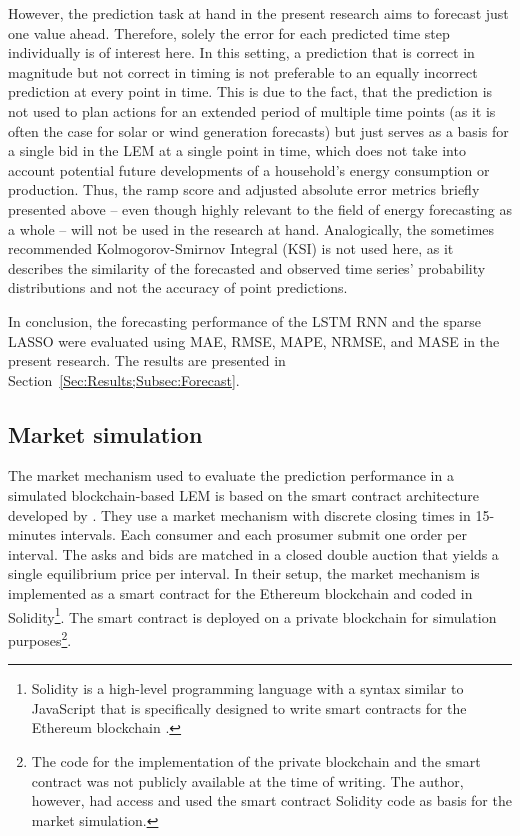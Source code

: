 However, the prediction task at hand in the present research aims to forecast just one value ahead. Therefore, solely the error for each predicted time step individually is of interest here. In this setting, a prediction that is correct in magnitude but not correct in timing is not preferable to an equally incorrect prediction at every point in time. This is due to the fact, that the prediction is not used to plan actions for an extended period of multiple time points (as it is often the case for solar or wind generation forecasts) but just serves as a basis for a single bid in the LEM at a single point in time, which does not take into account potential future developments of a household's energy consumption or production. Thus, the ramp score and adjusted absolute error metrics briefly presented above -- even though highly relevant to the field of energy forecasting as a whole -- will not be used in the research at hand. Analogically, the sometimes recommended Kolmogorov-Smirnov Integral (KSI) \citep{Espinar:2009} is not used here, as it describes the similarity of the forecasted and observed time series' probability distributions and not the accuracy of point predictions.

In conclusion, the forecasting performance of the LSTM RNN and the sparse LASSO were evaluated using MAE, RMSE, MAPE, NRMSE, and MASE in the present research. The results are presented in Section~\ref{Sec:Results;Subsec:Forecast}.




\subsection{Market simulation} \label{Sec:Method;Subsec:Market}

The market mechanism used to evaluate the prediction performance in a simulated blockchain-based LEM is based on the smart contract architecture developed by \cites{Mengelkamp:2018a}. They use a market mechanism with discrete closing times in 15-minutes intervals. Each consumer and each prosumer submit one order per interval. The asks and bids are matched in a closed double auction that yields a single equilibrium price per interval. In their setup, the market mechanism is implemented as a smart contract for the Ethereum blockchain and coded in Solidity\footnote{Solidity is a high-level programming language with a syntax similar to JavaScript that is specifically designed to write smart contracts for the Ethereum blockchain \citetext{see \citet{Ethereum:2018doc} for details}.}. The smart contract is deployed on a private blockchain for simulation purposes\footnote{The code for the implementation of the private blockchain and the smart contract was not publicly available at the time of writing. The author, however, had access and used the smart contract Solidity code as basis for the market simulation.}.

